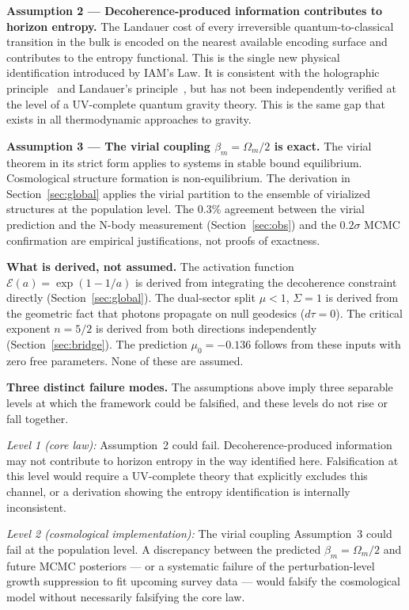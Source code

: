 \documentclass[12pt,a4paper]{article}
\begin{document}
\textbf{Assumption 2 --- Decoherence-produced information
contributes to horizon entropy.} The Landauer cost of every
irreversible quantum-to-classical transition in the bulk is encoded
on the nearest available encoding surface and contributes to the
entropy functional. This is the single new physical identification
introduced by IAM's Law. It is consistent with the holographic
principle~\citep{tHooft1993,Susskind1995} and Landauer's
principle~\citep{Landauer1961}, but has not been independently
verified at the level of a UV-complete quantum gravity theory. This
is the same gap that exists in all thermodynamic approaches to
gravity.

\textbf{Assumption 3 --- The virial coupling $\beta_m =
\Omega_m/2$ is exact.} The virial theorem in its strict form applies
to systems in stable bound equilibrium. Cosmological structure
formation is non-equilibrium. The derivation in Section~\ref{sec:global}
applies the virial partition to the ensemble of virialized structures
at the population level. The 0.3\% agreement between the virial
prediction and the N-body measurement (Section~\ref{sec:obs}) and the
$0.2\sigma$ MCMC confirmation are empirical justifications, not proofs
of exactness.

\textbf{What is derived, not assumed.} The activation function
$\mathcal{E}(a) = \exp(1-1/a)$ is derived from integrating the
decoherence constraint directly (Section~\ref{sec:global}). The
dual-sector split $\mu < 1$, $\Sigma = 1$ is derived from the
geometric fact that photons propagate on null geodesics
($d\tau = 0$). The critical exponent $n = 5/2$ is derived from both
directions independently (Section~\ref{sec:bridge}). The prediction
$\mu_0 = -0.136$ follows from these inputs with zero free
parameters. None of these are assumed.

\textbf{Three distinct failure modes.} The assumptions above imply
three separable levels at which the framework could be falsified,
and these levels do not rise or fall together.

\textit{Level 1 (core law):} Assumption~2 could fail. Decoherence-produced
information may not contribute to horizon entropy in the way
identified here. Falsification at this level would require a
UV-complete theory that explicitly excludes this channel, or a
derivation showing the entropy identification is internally
inconsistent.

\textit{Level 2 (cosmological implementation):} The virial
coupling Assumption~3 could fail at the population level. A
discrepancy between the predicted $\beta_m = \Omega_m/2$ and
future MCMC posteriors --- or a systematic failure of the
perturbation-level growth suppression to fit upcoming survey data
--- would falsify the cosmological model without necessarily
falsifying the core law.
\end{document}
